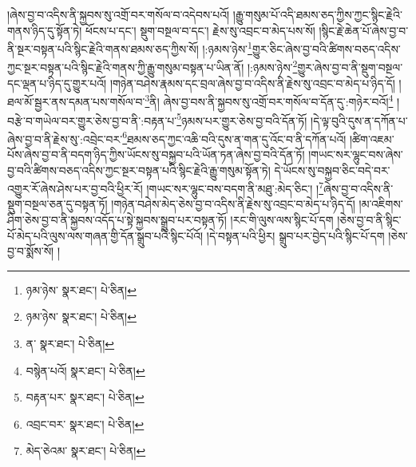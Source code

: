 །ཞེས་བྱ་བ་འདིས་ནི་སྐྱབས་སུ་འགྲོ་བར་གསོལ་བ་འདེབས་པའོ། །རྒྱུ་གསུམ་པོ་འདི་ཐམས་ཅད་ཀྱིས་ཀྱང་སྙིང་རྗེའི་གནས་ཉིད་དུ་སྟོན་ཏེ། ཕོངས་པ་དང་། སྡུག་བསྔལ་བ་དང་། རྗེས་སུ་འབྲང་བ་མེད་པས་སོ། །སྙིང་རྗེ་ཆེན་པོ་ཞེས་བྱ་བ་ནི་སྔར་བསྟན་པའི་སྙིང་རྗེའི་གནས་ཐམས་ཅད་ཀྱིས་སོ། །:ཉམས་ཉེས་\footnote{ཉམ་ཉེས་  སྣར་ཐང་།  པེ་ཅིན། }གྱུར་ཅིང་ཞེས་བྱ་བའི་ཚིགས་བཅད་འདིས་ཀྱང་སྔར་བསྟན་པའི་སྙིང་རྗེའི་གནས་ཀྱི་རྒྱུ་གསུམ་བསྟན་པ་ཡིན་ནོ། །:ཉམས་ཉེས་\footnote{ཉམ་ཉེས་  སྣར་ཐང་།  པེ་ཅིན། }གྱུར་ཞེས་བྱ་བ་ནི་སྡུག་བསྔལ་དང་ལྡན་པ་ཉིད་དུ་གྱུར་པའོ། །གཉེན་བཤེས་རྣམས་དང་བྲལ་ཞེས་བྱ་བ་འདིས་ནི་རྗེས་སུ་འབྲང་བ་མེད་པ་ཉིད་དོ། །ཐལ་མོ་སྦྱར་ནས་དམན་པས་གསོལ་བ་\footnote{ན་  སྣར་ཐང་།  པེ་ཅིན། }ནི། ཞེས་བྱ་བས་ནི་སྐྱབས་སུ་འགྲོ་བར་གསོལ་བ་དོན་དུ་:གཉེར་བའོ།\footnote{བསྙེན་པའོ།  སྣར་ཐང་།  པེ་ཅིན། } །བརྩེ་བ་གཡེལ་བར་གྱུར་ཅེས་བྱ་བ་ནི་:བརྟན་པ་\footnote{བརྟན་པར་  སྣར་ཐང་།  པེ་ཅིན། }ཉམས་པར་གྱུར་ཅེས་བྱ་བའི་དོན་ཏོ། །དེ་ལྟ་བུའི་དུས་ན་དཀོན་པ་ཞེས་བྱ་བ་ནི་རྗེས་སུ་:འབྲེང་བར་\footnote{འབྲང་བར་  སྣར་ཐང་།  པེ་ཅིན། }ཐམས་ཅད་ཀྱང་འཆི་བའི་དུས་ན་གན་དུ་འོང་བ་ནི་དཀོན་པའོ། །ཚིག་འཇམ་པོས་ཞེས་བྱ་བ་ནི་བདག་ཉིད་ཀྱིས་ཡོངས་སུ་བསྐྱབ་པའི་ཡོན་ཏན་ཞེས་བྱ་བའི་དོན་ཏོ། །གཡང་སར་ལྷུང་བས་ཞེས་བྱ་བའི་ཚིགས་བཅད་འདིས་ཀྱང་སྔར་བསྟན་པའི་སྙིང་རྗེའི་རྒྱུ་གསུམ་སྟོན་ཏེ། དེ་ཡོངས་སུ་བསྐྱབ་ཅིང་བདེ་བར་འགྱུར་རོ་ཞེས་ཤེས་པར་བྱ་བའི་ཕྱིར་རོ། །གཡང་སར་ལྷུང་བས་བདག་ནི་མཐུ་:མེད་ཅིང་། །\footnote{མེད་ཅེའམ་  སྣར་ཐང་།  པེ་ཅིན། }ཞེས་བྱ་བ་འདིས་ནི་སྡུག་བསྔལ་ཅན་དུ་བསྟན་ཏོ། །གཉེན་བཤེས་མེད་ཅེས་བྱ་བ་འདིས་ནི་རྗེས་སུ་འབྲང་བ་མེད་པ་ཉིད་དོ། །མ་འཇིགས་ཤིག་ཅེས་བྱ་བ་ནི་སྐྱབས་འདོད་པ་སྟེ་སྐྱབས་སྒྲུབ་པར་བསྟན་ཏོ། །རང་གི་ལུས་ལས་སྙིང་པོ་དག །ཅེས་བྱ་བ་ནི་སྙིང་པོ་མེད་པའི་ལུས་ལས་གཞན་གྱི་དོན་སྒྲུབ་པའི་སྙིང་པོའོ། །དེ་བསྟན་པའི་ཕྱིར། སྒྲུབ་པར་བྱེད་པའི་སྙིང་པོ་དག །ཅེས་བྱ་བ་སྨོས་སོ། །
